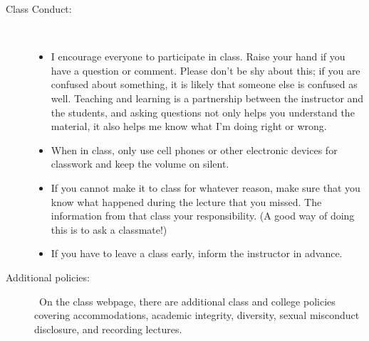 \documentclass [letterpaper,11pt]{article}
\begin{document}
\begin{description}
\item[Class Conduct:] \
   \begin{itemize}\setlength{\itemsep}{0em}\setlength{\parskip}{0pt}
   	\item I encourage everyone to participate in class.  Raise your hand if you have
	a question or comment.  Please don't be shy about this; if you are confused about
	something, it is likely that someone else is confused as well.
		Teaching and learning is a partnership between the instructor and the students, and asking questions not only helps you understand the material, it also
		helps me know what I'm doing right or wrong.
			     \item When in class, only use cell phones or other electronic devices for classwork and keep
the volume on silent.
			          \item  If you cannot make it to class for whatever reason, make sure that
       you know what happened during the lecture that you missed. The information from that class
       your responsibility. (A good way of doing this is to ask a classmate!)
     \item  If you have to leave a class early, inform the instructor in
       advance. 
     \end{itemize}
     
\item[Additional policies:] \
On the class webpage, there are additional class and college policies covering accommodations, academic integrity, diversity, sexual misconduct disclosure,
and recording lectures.  
   
   
\end{description}

   
\end{document}
